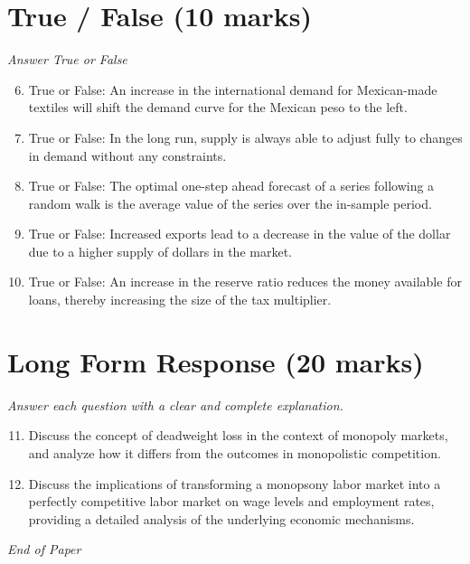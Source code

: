 \documentclass[12pt]{article}
\begin{document}
\section*{True / False (10 marks)}
\textit{Answer True or False}
\begin{enumerate}[label=\arabic*.]
\setcounter{enumi}{5}
\item True or False: An increase in the international demand for Mexican-made textiles will shift the demand curve for the Mexican peso to the left.
\item True or False: In the long run, supply is always able to adjust fully to changes in demand without any constraints.
\item True or False: The optimal one-step ahead forecast of a series following a random walk is the average value of the series over the in-sample period.
\item True or False: Increased exports lead to a decrease in the value of the dollar due to a higher supply of dollars in the market.
\item True or False: An increase in the reserve ratio reduces the money available for loans, thereby increasing the size of the tax multiplier.
\end{enumerate}

\section*{Long Form Response (20 marks)}
\textit{Answer each question with a clear and complete explanation.}
\begin{enumerate}[label=\arabic*.]
\setcounter{enumi}{10}
\item Discuss the concept of deadweight loss in the context of monopoly markets, and analyze how it differs from the outcomes in monopolistic competition.
\item Discuss the implications of transforming a monopsony labor market into a perfectly competitive labor market on wage levels and employment rates, providing a detailed analysis of the underlying economic mechanisms.
\end{enumerate}

\vfill
\noindent\textit{End of Paper}
\end{document}
